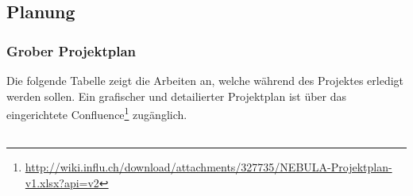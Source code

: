 \newpage
\subsection{Planung} 
\subsubsection{Grober Projektplan}
Die folgende Tabelle zeigt die Arbeiten an, welche während des Projektes erledigt werden sollen. Ein grafischer und detailierter Projektplan ist über das eingerichtete Confluence\footnote{\url{http://wiki.influ.ch/download/attachments/327735/NEBULA-Projektplan-v1.xlsx?api=v2}} zugänglich.

\begin{table}[H]
\centering
\begin{tabular}{|p{0.7cm}p{6.8cm}p{2cm}p{2cm}|c|c|c|}


\end{tabular}
\end{table}
